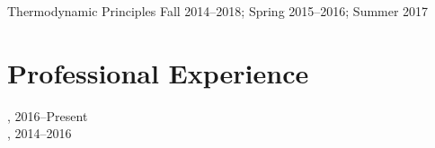 \begin{outerlist}
\item Thermodynamic Principles \hfill Fall 2014--2018; Spring 2015--2016; Summer 2017


\end{outerlist}

\section{{\sectionfont{} Professional Experience}}

,  \hfill 2016--Present\\
,  \hfill 2014--2016

